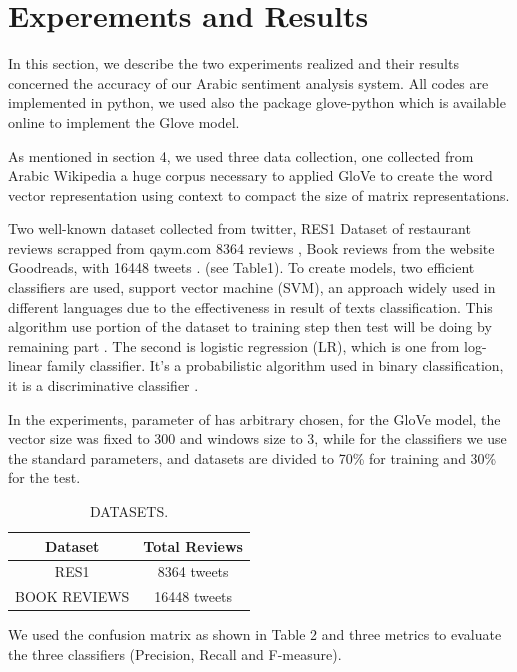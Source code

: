 \documentclass[conference]{IEEEtran}
\begin{document}
\section{Experements and Results}
In this section, we describe the two experiments realized and their results concerned the accuracy of our Arabic sentiment analysis system. All codes are implemented in python, we used also the package glove-python which is available online to implement the Glove model. 

As mentioned in section 4, we used three data collection, one collected from Arabic Wikipedia a huge corpus necessary to applied GloVe to create the word vector representation using context to compact the size of matrix representations. 

Two well-known dataset collected from twitter, RES1 Dataset of restaurant reviews scrapped from qaym.com 8364 reviews , Book reviews from the website Goodreads, with 16448 tweets . (see Table1).
To create models, two efficient classifiers are used, support vector machine (SVM), an approach widely used in different languages due to the effectiveness in result of texts classification. This algorithm use portion of the dataset to training step then test will be doing by remaining part . The second is logistic regression (LR), which is one from log-linear family classifier. It’s a probabilistic algorithm used in binary classification, it is a discriminative classifier .

In the experiments, parameter of has arbitrary chosen, for the GloVe model, the vector size was fixed to 300 and windows size to 3, while for the classifiers we use the standard parameters, and datasets are divided to 70\% for training and 30\% for the test.

\begin{table}[!ht]
	\large        %
	\caption{DATASETS.}\label{label}
	\centering    %
	\begin{tabular}{|c|c|}
		\hline
		Dataset&Total Reviews\\     %
		\hline
		RES1&8364 tweets\\
		\hline
		BOOK REVIEWS&16448 tweets\\
		\hline
	
	\end{tabular}
\end{table}

We used the confusion matrix as shown in Table 2 and three metrics to evaluate the three classifiers (Precision, Recall and F-measure).
\end{document}
